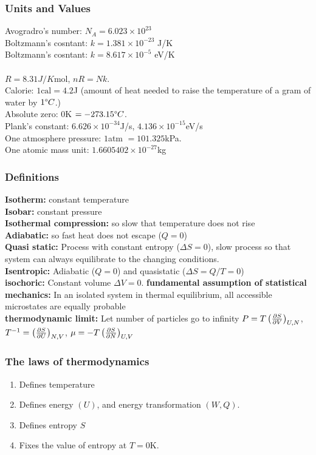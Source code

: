 \documentclass[a4paper, norsk, 8pt]{article}
\begin{document}
\tiny
\begin{multicols*}{3}
\subsubsection*{\scriptsize Units and Values}
Avogradro's number: $N_A=6.023\times 10^{23}$ \\
Boltzmann's cosntant: $k=1.381\times 10^{-23}$ J/K\\
Boltzmann's cosntant: $k = 8.617 \times 10^{-5}$ eV/K\\
\\ $R = 8.31J/K\text{mol}$, $nR=Nk$.\\
Calorie: $1\text{cal} = 4.2$J (amount of heat needed to raise the temperature of a gram of water by $1\degree C$.)\\
Absolute zero: $0$K $=-273.15\degree C$.\\
Plank's constant: $6.626\times 10^{-34}$J/s, $4.136\times 10^{-15}$eV/s\\
One atmosphere pressure: $1$atm $=101.325$kPa.\\
One atomic mass unit: $1.6605402\times 10^{-27}$kg

\subsubsection*{\scriptsize Definitions}
\textbf{Isotherm:} constant temperature \\
\textbf{Isobar:} constant pressure \\
\textbf{Isothermal compression:} so slow that temperature does not rise \\
\textbf{Adiabatic:} so fast heat does not escape ($Q=0$) \\
\textbf{Quasi static:} Process with constant entropy ($\Delta S = 0$), slow process so that system can always equilibrate to the changing conditions.\\
\textbf{Isentropic:} Adiabatic ($Q=0$) and quasistatic ($\Delta S = Q/T=0$)\\
\textbf{isochoric:} Constant volume $\Delta V = 0$.
\textbf{fundamental assumption of statistical mechanics:} In an isolated system in thermal equilibrium, all accessible microstates are equally probable\\
\textbf{thermodynamic limit:} Let number of particles go to infinity
$P=T\left( \pdv{S}{V} \right)_{U,N}$, $T^{-1}=\left( \pdv{S}{U} \right)_{N,V}$, $\mu=-T\left( \pdv{S}{N} \right)_{U,V}$

\subsubsection*{\scriptsize The laws of thermodynamics}
\begin{enumerate}
  \setcounter{enumi}{0}
  \item Defines temperature
  \item Defines energy $(U)$, and energy transformation $(W, Q)$.
  \item Defines entropy $S$
  \item Fixes the value of entropy at $T=0$K.
\end{enumerate}



\end{multicols*}
\end{document}
